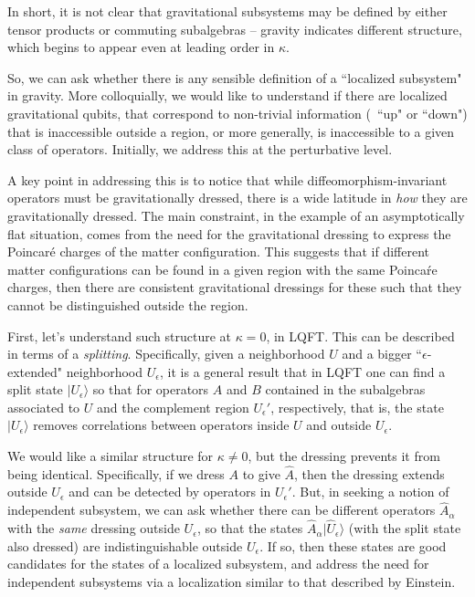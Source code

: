In short, it is not clear that gravitational subsystems may be defined by either tensor products or commuting subalgebras -- gravity indicates different structure, which begins to appear even at leading order in $\kappa$.

So, we can ask whether there is any sensible definition of a ``localized subsystem" in gravity.  More colloquially, we would like to understand if there are localized gravitational qubits, that correspond to non-trivial information (\eg\ ``up" or ``down") that is inaccessible outside a region, or more generally, is inaccessible to a given class of operators.  Initially, we address this at the perturbative level.

A key point in addressing this is to notice that while diffeomorphism-invariant operators must be gravitationally dressed, there is a wide latitude in {\it how} they are gravitationally dressed.  The main constraint, in the example of an asymptotically flat situation, comes from the need for the gravitational dressing to express the Poincar\'e charges of the matter configuration.  This suggests that if different matter configurations can be found in a given region  with the same Poinca\'re charges, then there are consistent gravitational dressings for these such that they cannot be distinguished outside the region.

First, let's understand such structure at $\kappa=0$, in LQFT.  This can be described in terms of a {\it splitting}.  Specifically, given a neighborhood $U$ and a bigger ``$\epsilon$-extended" neighborhood $U_\epsilon$, it is a general result that in LQFT one can find a split state $|U_\epsilon\rangle$ so that for operators $A$ and $B$ contained in the subalgebras associated to $U$ and the complement region $U_\epsilon'$, respectively, 
%
\eqn{}
%
that is, the state  $|U_\epsilon\rangle$ removes correlations between operators inside $U$ and outside $U_\epsilon$.

We would like a similar structure for $\kappa\neq0$, but the dressing prevents it from being identical.  Specifically, if we dress $A$ to give $\hat A$, then the dressing extends outside $U_\epsilon$ and can be detected by operators in $U_\epsilon'$.  But, in seeking a notion of independent subsystem, we can ask whether there can be different operators $\hat A_\alpha$ with the {\it same} dressing outside $U_\epsilon$, so that the states $\hat A_\alpha |\hat U_\epsilon\rangle$ (with the split state also dressed) are indistinguishable outside $U_\epsilon$.  If so, then these states are good candidates for the states of a localized subsystem, and address the need for independent subsystems via a localization similar to that described by Einstein.


